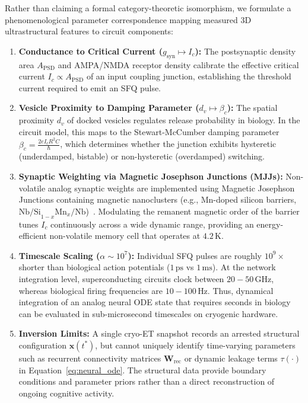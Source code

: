 \documentclass[10pt,twocolumn,letterpaper]{article}
\begin{document}
Rather than claiming a formal category-theoretic isomorphism, we formulate a phenomenological parameter correspondence mapping measured 3D ultrastructural features to circuit components:

\begin{enumerate}
  \item \textbf{Conductance to Critical Current ($g_{\text{syn}} \mapsto I_c$):} The postsynaptic density area $A_{\text{PSD}}$ and AMPA/NMDA receptor density calibrate the effective critical current $I_c \propto A_{\text{PSD}}$ of an input coupling junction, establishing the threshold current required to emit an SFQ pulse.
  \item \textbf{Vesicle Proximity to Damping Parameter ($d_v \mapsto \beta_c$):} The spatial proximity $d_v$ of docked vesicles regulates release probability in biology. In the circuit model, this maps to the Stewart-McCumber damping parameter $\beta_c = \frac{2e I_c R^2 C}{\hbar}$, which determines whether the junction exhibits hysteretic (underdamped, bistable) or non-hysteretic (overdamped) switching.
  \item \textbf{Synaptic Weighting via Magnetic Josephson Junctions (MJJs):} Non-volatile analog synaptic weights are implemented using Magnetic Josephson Junctions containing magnetic nanoclusters (e.g., Mn-doped silicon barriers, $\text{Nb/Si}_{1-x}\text{Mn}_x\text{/Nb}$)~\cite{schneider2018ultralow}. Modulating the remanent magnetic order of the barrier tunes $I_c$ continuously across a wide dynamic range, providing an energy-efficient non-volatile memory cell that operates at $4.2\,\text{K}$.
  \item \textbf{Timescale Scaling ($\alpha \sim 10^7$):} Individual SFQ pulses are roughly $10^9\times$ shorter than biological action potentials ($1\,\text{ps}$ vs $1\,\text{ms}$). At the network integration level, superconducting circuits clock between $20 - 50\,\text{GHz}$, whereas biological firing frequencies are $10 - 100\,\text{Hz}$. Thus, dynamical integration of an analog neural ODE state that requires seconds in biology can be evaluated in sub-microsecond timescales on cryogenic hardware.
  \item \textbf{Inversion Limits:} A single cryo-ET snapshot records an arrested structural configuration $\mathbf{x}(t^*)$, but cannot uniquely identify time-varying parameters such as recurrent connectivity matrices $\mathbf{W}_{\text{rec}}$ or dynamic leakage terms $\tau(\cdot)$ in Equation~\ref{eq:neural_ode}. The structural data provide boundary conditions and parameter priors rather than a direct reconstruction of ongoing cognitive activity.
\end{enumerate}
\end{document}
